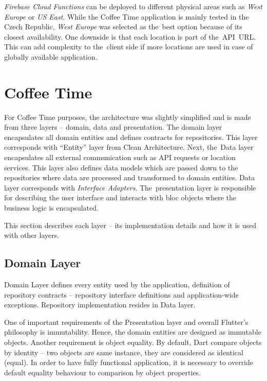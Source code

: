 \textit{Firebase Cloud Functions} can be deployed to different physical areas such as \textit{West Europe} or \textit{US East}. While the Coffee Time application is mainly tested in the Czech Republic, \textit{West Europe} was selected as the~best option because of its closest availability. One downside is that each location is part of the~API~URL. This can add complexity to the~client side if more locations are used in case of globally available application. 

\section{Coffee Time}
For Coffee Time purposes, the architecture was slightly simplified and is made from three layers -- domain, data and presentation. The domain layer encapsulates all domain entities and defines contracts for repositories. This layer corresponds with ``Entity'' layer from Clean Architecture. Next, the~Data layer encapsulates all external communication such as API requests or location services. This layer also defines data models which are passed down to the repositories where data are processed and transformed to domain entities. Data layer corresponds with \textit{Interface Adapters}. The~presentation layer is responsible for describing the user interface and interacts with \gls{bloc} objects where the business logic is encapsulated.

This section describes each layer -- its implementation details and how it is used with other layers.  
\subsection{Domain Layer}
Domain Layer defines every entity used by the application, definition of repository contracts -- repository interface definitions and application-wide exceptions. Repository implementation resides in Data layer. 

One of important requirements of the Presentation layer and overall Flutter's philosophy is immutability. Hence, the domain entities are designed as immutable objects. Another requirement is object equality. By default, Dart compare objects by identity -- two objects are same instance, they are considered as identical (equal). In order to have fully functional application, it is necessary to override default equality behaviour to comparison by object properties. 

